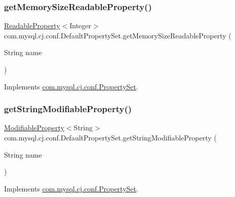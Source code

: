 \subsubsection{\texorpdfstring{get\+Memory\+Size\+Readable\+Property()}{getMemorySizeReadableProperty()}}
{\footnotesize\ttfamily \mbox{\hyperlink{interfacecom_1_1mysql_1_1cj_1_1conf_1_1_readable_property}{Readable\+Property}}$<$Integer$>$ com.\+mysql.\+cj.\+conf.\+Default\+Property\+Set.\+get\+Memory\+Size\+Readable\+Property (\begin{DoxyParamCaption}\item[{String}]{name }\end{DoxyParamCaption})}



Implements \mbox{\hyperlink{interfacecom_1_1mysql_1_1cj_1_1conf_1_1_property_set_a0eca5d050976ad2291e7ac05bc8f4bf6}{com.\+mysql.\+cj.\+conf.\+Property\+Set}}.

\mbox{\label{classcom_1_1mysql_1_1cj_1_1conf_1_1_default_property_set_a44d16d90d0307d426c319163a8a0811e}} 
\subsubsection{\texorpdfstring{get\+String\+Modifiable\+Property()}{getStringModifiableProperty()}}
{\footnotesize\ttfamily \mbox{\hyperlink{interfacecom_1_1mysql_1_1cj_1_1conf_1_1_modifiable_property}{Modifiable\+Property}}$<$String$>$ com.\+mysql.\+cj.\+conf.\+Default\+Property\+Set.\+get\+String\+Modifiable\+Property (\begin{DoxyParamCaption}\item[{String}]{name }\end{DoxyParamCaption})}



Implements \mbox{\hyperlink{interfacecom_1_1mysql_1_1cj_1_1conf_1_1_property_set_ac67409f3c62157f17e4dfb2ccd320e84}{com.\+mysql.\+cj.\+conf.\+Property\+Set}}.

\mbox{\label{classcom_1_1mysql_1_1cj_1_1conf_1_1_default_property_set_a3eedd64227cd2e0ad94201c64992a259}} 
